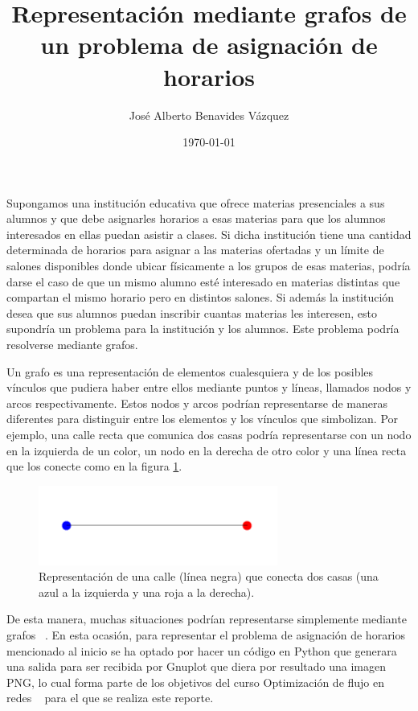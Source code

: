 \documentclass{article}
\title{Representación mediante grafos de un problema de asignación de horarios}
\author{José Alberto Benavides Vázquez}
\date{\today}
\begin{document}
  \maketitle

  Supongamos una institución educativa que ofrece materias presenciales a sus alumnos y que debe asignarles horarios a esas materias para que los alumnos interesados en ellas puedan asistir a clases. Si dicha institución tiene una cantidad determinada de horarios para asignar a las materias ofertadas y un límite de salones disponibles donde ubicar físicamente a los grupos de esas materias, podría darse el caso de que un mismo alumno esté interesado en materias distintas que compartan el mismo horario pero en distintos salones. Si además la institución desea que sus alumnos puedan inscribir cuantas materias les interesen, esto supondría un problema para la institución y los alumnos. Este problema podría resolverse mediante grafos.

  Un grafo es una representación de elementos cualesquiera y de los posibles vínculos que pudiera haber entre ellos mediante puntos y líneas, llamados nodos y arcos respectivamente. Estos nodos y arcos podrían representarse de maneras diferentes para distinguir entre los elementos y los vínculos que simbolizan. Por ejemplo, una calle recta que comunica dos casas podría representarse con un nodo en la izquierda de un color, un nodo en la derecha de otro color y una línea recta que los conecte como en la figura \ref{fig:carrera}.

  \begin{figure}[h] %
    \includegraphics[width=0.7\textwidth]{carrera}
    \centering
    \caption{Representación de una calle (línea negra) que conecta dos casas (una azul a la izquierda y una roja a la derecha).}
    \label{fig:carrera}
  \end{figure}

  De esta manera, muchas situaciones podrían representarse simplemente mediante grafos ~\cite{BarabasiNetwork}. En esta ocasión, para representar el problema de asignación de horarios mencionado al inicio se ha optado por hacer un código en Python que generara una salida para ser recibida por Gnuplot que diera por resultado una imagen PNG, lo cual forma parte de los objetivos del curso Optimización de flujo en redes ~\cite{SchaefferNetwork} para el que se realiza este reporte.
\end{document}
